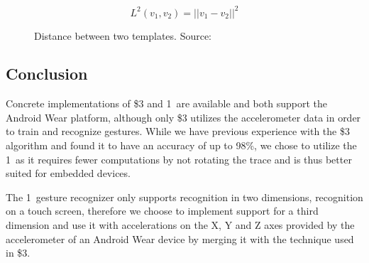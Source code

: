 \begin{figure}[h]
\[ L^{2}(v_1, v_2) = \lvert\lvert v_1 - v_2 \rvert\rvert^2 \]
\label{eq:one-cent-l-squared}
\caption{Distance between two templates. Source: \cite{herold20121}}
\end{figure}

\subsection{Conclusion}

Concrete implementations of \$3 and 1\textcent~are available and both support the Android Wear platform, although only \$3 utilizes the accelerometer data in order to train and recognize gestures. While we have previous experience with the \$3 algorithm and found it to have an accuracy of up to 98\%, we chose to utilize the 1\textcent~as it requires fewer computations by not rotating the trace and is thus better suited for embedded devices.

The 1\textcent~gesture recognizer only supports recognition in two dimensions, \eg recognition on a touch screen, therefore we choose to implement support for a third dimension and use it with accelerations on the X, Y and Z axes provided by the accelerometer of an Android Wear device by merging it with the technique used in \$3.

